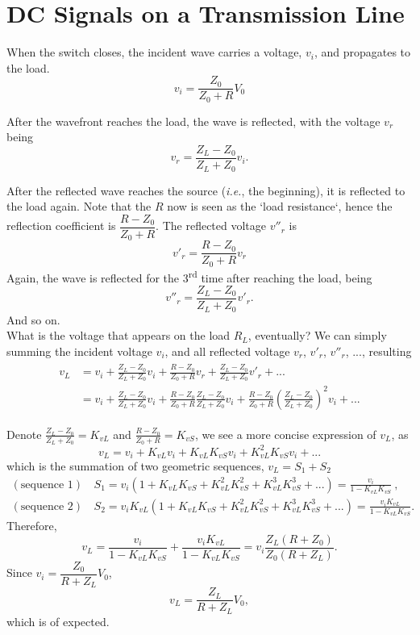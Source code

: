 \documentclass[12pt,a4paper]{article}
\begin{document}
\section{DC Signals on a Transmission Line}
When the switch closes, the incident wave carries a voltage, $v_i$, and propagates to the load.
\[
    v_i = \frac{Z_0}{Z_0+R} V_0
\]

After the wavefront reaches the load, the wave is reflected, with the voltage $v_r$ being 
\[
    v_r = \frac{Z_L-Z_0}{Z_L+Z_0} v_i.
\]

After the reflected wave reaches the source (\textit{i.e.}, the beginning), it is reflected to the load again. Note that the $R$ now is seen as the `load resistance`, hence the reflection coefficient is $\dfrac{R-Z_0}{Z_0+R}$. The reflected voltage $v''_r$ is
\[
    v'_r = \frac{R-Z_0}{Z_0+R} v_r 
\]
Again, the wave is reflected for the 3\textsuperscript{rd} time after reaching the load, being
\[
    v''_r = \frac{Z_L-Z_0}{Z_L+Z_0} v'_r.
\]
And so on. \\

What is the voltage that appears on the load $R_L$, eventually? We can simply summing the incident voltage $v_i$, and all reflected voltage $v_r$, $v'_r$, $v''_r$, ..., resulting
\begin{align}
\begin{split}
    v_L 
    &= v_i + \frac{Z_L-Z_0}{Z_L+Z_0} v_i + \frac{R-Z_0}{Z_0+R} v_r + \frac{Z_L-Z_0}{Z_L+Z_0} v'_r + ... \\
    &= v_i + \frac{Z_L-Z_0}{Z_L+Z_0} v_i + \frac{R-Z_0}{Z_0+R}\frac{Z_L-Z_0}{Z_L+Z_0} v_i + \frac{R-Z_0}{Z_0+R} \left(\frac{Z_L-Z_0}{Z_L+Z_0}\right)^2 v_i + ...
\end{split}
\end{align}

Denote $\frac{Z_L-Z_0}{Z_L+Z_0} = K_{vL}$ and $\frac{R-Z_0}{Z_0+R} = K_{vS}$, we see a more concise expression of $v_L$, as 
\begin{equation}
    v_L = v_i + K_{vL} v_i + K_{vL}K_{vS} v_i + K_{vL}^2 K_{vS} v_i + ...
\end{equation}
which is the summation of two geometric sequences, $v_L = S_1 + S_2$
\begin{align}
    (\text{sequence 1}) &\quad
    S_1 = v_i (1 + K_{vL} K_{vS} + K_{vL}^2 K_{vS}^2 + K_{vL}^3 K_{vS}^3 + ...) = \frac{v_i}{1-K_{vL}K_{vS}} \ ,\\
    (\text{sequence 2}) &\quad
    S_2 = v_i  K_{vL} (1 + K_{vL} K_{vS} +  K_{vL}^2 K_{vS}^2 + K_{vL}^3 K_{vS}^3 + ...) = \frac{v_i  K_{vL}}{1-K_{vL}K_{vS}} .
\end{align}
Therefore,
\begin{equation}
    v_L = \frac{v_i}{1-K_{vL}K_{vS}} + \frac{v_i K_{vL}}{1-K_{vL}K_{vS}} = v_i \frac{Z_L (R+Z_0)}{Z_0 (R+Z_L)}.
\end{equation}
Since $v_i = \dfrac{Z_0}{R+Z_L} V_0$,
\begin{equation}
    v_L = \frac{Z_L}{R+Z_L} V_0,
\end{equation}
which is of expected.
\end{document}
